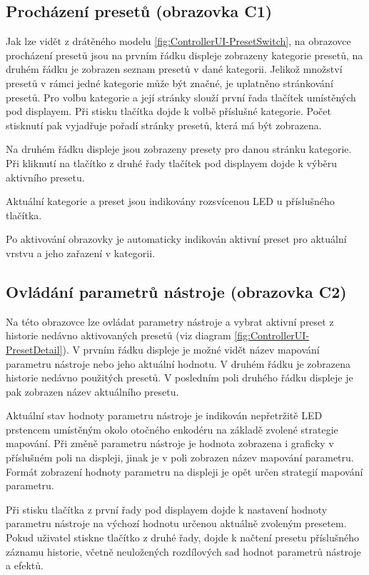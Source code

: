 \documentclass[thesis=M,czech]{FITthesis}[2019/03/06]
\begin{document}
		\subsection{Procházení presetů (obrazovka C1)}\label{sec:C1}
			Jak lze vidět z drátěného modelu \ref{fig:ControllerUI-PresetSwitch}, na obrazovce procházení presetů jsou na prvním řádku displeje
			zobrazeny kategorie presetů, na druhém řádku je zobrazen seznam presetů v dané kategorii.
			Jelikož množství presetů v rámci jedné kategorie může být značné, je uplatněno stránkování presetů.
			Pro volbu kategorie a její stránky slouží první řada tlačítek umístěných pod displayem.
			Při stisku tlačítka dojde k volbě příslušné kategorie. Počet stisknutí pak vyjadřuje pořadí stránky presetů, která má být zobrazena.
			
			Na druhém řádku displeje jsou zobrazeny presety pro danou stránku kategorie. Při kliknutí na tlačítko 
			z druhé řady tlačítek pod displayem dojde k výběru aktivního presetu.
			
			Aktuální kategorie a preset jsou indikovány rozsvícenou LED u příslušného tlačítka.
			
			Po aktivování obrazovky je automaticky indikován aktivní preset pro
			aktuální vrstvu a jeho zařazení v kategorii.
			
		\subsection{Ovládání parametrů nástroje (obrazovka C2)}\label{sec:C2}
			Na této obrazovce lze ovládat parametry nástroje a vybrat aktivní preset z historie nedávno aktivovaných presetů (viz diagram \ref{fig:ControllerUI-PresetDetail}).
			V prvním řádku displeje je možné vidět název mapování parametru nástroje nebo jeho aktuální hodnotu. V druhém řádku
			je zobrazena historie nedávno použitých presetů. V posledním poli druhého řádku displeje je pak zobrazen název
			aktuálního presetu.
			
			Aktuální stav hodnoty parametru nástroje je indikován nepřetržitě LED prstencem umístěným okolo otočného enkodéru na základě
			zvolené strategie mapování. Při změně parametru nástroje je hodnota zobrazena i graficky v příslušném poli na displeji, jinak je v poli zobrazen název mapování parametru.
			Formát zobrazení hodnoty parametru na displeji je opět určen strategií mapování parametru.
			
			Při stisku tlačítka z první řady pod displayem dojde k nastavení hodnoty parametru nástroje na výchozí hodnotu určenou aktuálně zvoleným presetem.		
			Pokud uživatel stiskne tlačítko z druhé řady, dojde k načtení presetu příslušného záznamu historie, včetně neuložených rozdílových sad hodnot parametrů nástroje a efektů.
			
\end{document}

